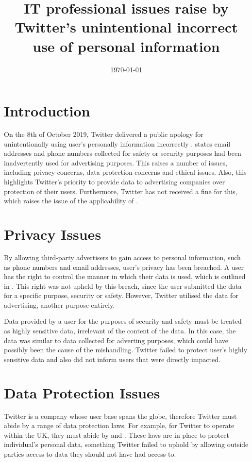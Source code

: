 \documentclass[a4paper, 11pt]{article}
\begin{document}
\title{IT professional issues raise by Twitter's unintentional incorrect use of personal information}
\date{\today}
\maketitle

\section{Introduction}
On the 8th of October 2019, Twitter delivered a public apology for unintentionally using user's personally information incorrectly \parencite{support_twitter_2019}.
\textcite{support_personal_2019} states email addresses and phone numbers collected for safety or security purposes had been inadvertently used for advertising purposes.
This raises a number of issues, including privacy concerns, data protection concerns and ethical issues.
Also, this highlights Twitter's priority to provide data to advertising companies over protection of their users.
Furthermore, Twitter has not received a fine for this, which raises the issue of the applicability of \textcite{_regulation_2016}.

\section{Privacy Issues}
By allowing third-party advertisers to gain access to personal information, such as phone numbers and email addresses, user's privacy has been breached.
A user has the right to control the manner in which their data is used, which is outlined in \textcite{twitter_privacy_2018}.
This right was not upheld by this breach, since the user submitted the data for a specific purpose, security or safety.
However, Twitter utilised the data for advertising, another purpose entirely.

Data provided by a user for the purposes of security and safety must be treated as highly sensitive data, irrelevant of the content of the data.
In this case, the data was similar to data collected for adverting purposes, which could have possibly been the cause of the mishandling.
Twitter failed to protect user's highly sensitive data and also did not inform users that were directly impacted.

\section{Data Protection Issues}
Twitter is a company whose user base spans the globe, therefore Twitter must abide by a range of data protection laws.
For example, for Twitter to operate within the UK, they must abide by \textcite{_data_2018} and \textcite{_regulation_2016}.
These laws are in place to protect individual's personal data, something Twitter failed to uphold by allowing outside parties access to data they should not have had access to.
\end{document}
